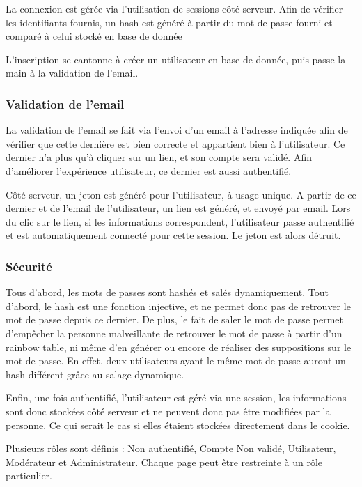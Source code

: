 \documentclass[a4paper,11pt]{article}
\begin{document}
La connexion est gérée via l'utilisation de sessions côté serveur. Afin de vérifier les identifiants fournis, un hash est généré à partir du mot de passe fourni et comparé à celui stocké en base de donnée

L'inscription se cantonne à créer un utilisateur en base de donnée, puis passe la main à la validation de l'email.

\subsubsection{Validation de l'email}

La validation de l'email se fait via l'envoi d'un email à l'adresse indiquée afin de vérifier que cette dernière est bien correcte et appartient bien à l'utilisateur. Ce dernier n'a plus qu'à cliquer sur un lien, et son compte sera validé. Afin d'améliorer l'expérience utilisateur, ce dernier est aussi authentifié. 

Côté serveur, un jeton est généré pour l'utilisateur, à usage unique. A partir de ce dernier et de l'email de l'utilisateur, un lien est généré, et envoyé par email. Lors du clic sur le lien, si les informations correspondent, l'utilisateur passe authentifié et est automatiquement connecté pour cette session. Le jeton est alors détruit.

\subsubsection{Sécurité}

Tous d'abord, les mots de passes sont hashés et salés dynamiquement. Tout d'abord, le hash est une fonction injective, et ne permet donc pas de retrouver le mot de passe depuis ce dernier. De plus, le fait de saler le mot de passe permet d'empêcher la personne malveillante de retrouver le mot de passe à partir d'un rainbow table, ni même d'en générer ou encore de réaliser des suppositions sur le mot de passe. En effet, deux utilisateurs ayant le même mot de passe auront un hash différent grâce au salage dynamique.

Enfin, une fois authentifié, l'utilisateur est géré via une session, les informations sont donc stockées côté serveur et ne peuvent donc pas être modifiées par la personne. Ce qui serait le cas si elles étaient stockées directement dans le cookie.

Plusieurs rôles sont définis : Non authentifié, Compte Non validé, Utilisateur, Modérateur et Administrateur. Chaque page peut être restreinte à un rôle particulier.
\end{document}
